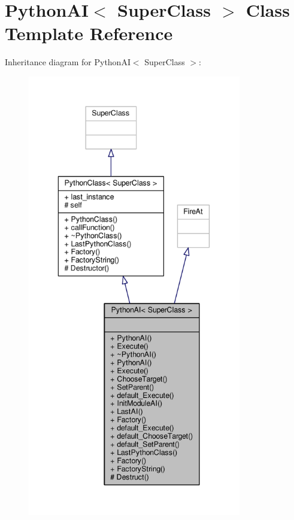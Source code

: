 \hypertarget{classPythonAI}{}\section{Python\+AI$<$ Super\+Class $>$ Class Template Reference}
\label{classPythonAI}


Inheritance diagram for Python\+AI$<$ Super\+Class $>$\+:
\nopagebreak
\begin{figure}[H]
\begin{center}
\leavevmode
\includegraphics[height=550pt]{d6/d99/classPythonAI__inherit__graph}
\end{center}
\end{figure}


